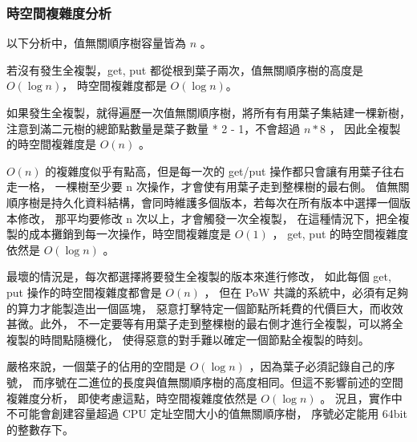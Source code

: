 \subsubsection{時空間複雜度分析}

以下分析中，值無關順序樹容量皆為 $n$ 。

若沒有發生全複製，get, put 都從根到葉子兩次，值無關順序樹的高度是 $O(\log n)$，
時空間複雜度都是 $O(\log n)$。

如果發生全複製，就得遍歷一次值無關順序樹，將所有有用葉子集結建一棵新樹，
注意到滿二元樹的總節點數量是葉子數量 * 2 - 1，不會超過 $n * 8$ ，
因此全複製的時空間複雜度是 $O(n)$ 。

$O(n)$ 的複雜度似乎有點高，但是每一次的 get/put 操作都只會讓有用葉子往右走一格，
一棵樹至少要 n 次操作，才會使有用葉子走到整棵樹的最右側。
值無關順序樹是持久化資料結構，會同時維護多個版本，若每次在所有版本中選擇一個版本修改，
那平均要修改 n 次以上，才會觸發一次全複製，
在這種情況下，把全複製的成本攤銷到每一次操作，時空間複雜度是 $O(1)$ ，
get, put 的時空間複雜度依然是 $O(\log n)$ 。

最壞的情況是，每次都選擇將要發生全複製的版本來進行修改，
如此每個 get, put 操作的時空間複雜度都會是 $O(n)$ ，
但在 PoW 共識的系統中，必須有足夠的算力才能製造出一個區塊，
惡意打擊特定一個節點所耗費的代價巨大，而收效甚微。此外，
不一定要等有用葉子走到整棵樹的最右側才進行全複製，可以將全複製的時間點隨機化，
使得惡意的對手難以確定一個節點全複製的時刻。

嚴格來說，一個葉子的佔用的空間是 $O(\log n)$ ，因為葉子必須記錄自己的序號，
而序號在二進位的長度與值無關順序樹的高度相同。但這不影響前述的空間複雜度分析，
即使考慮這點，時空間複雜度依然是 $O(\log n)$ 。
況且，實作中不可能會創建容量超過 CPU 定址空間大小的值無關順序樹，
序號必定能用 64bit 的整數存下。